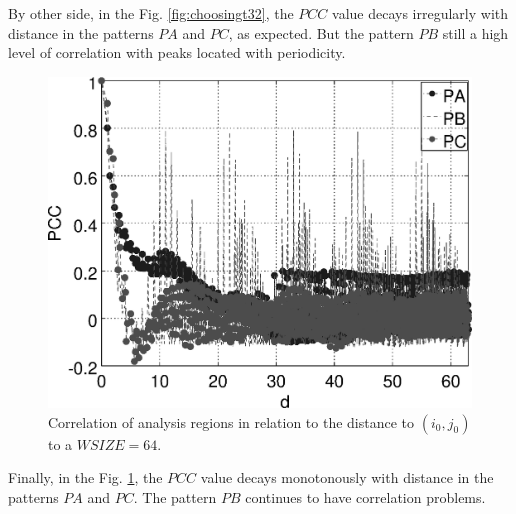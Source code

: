 By other side, in the Fig. \ref{fig:choosingt32}, the $PCC$ value decays irregularly with 
distance in the patterns $PA$ and $PC$, as expected. But the pattern $PB$ still 
a high level of correlation with  peaks located with periodicity.
\begin{figure}[H]
\centering
  \includegraphics[width=.55\columnwidth]{image_plot-64.eps}
  \caption{Correlation of analysis regions in relation to the distance to $(i_0,j_0)$ to a $WSIZE=64$.}
  \label{fig:choosingt64}
\end{figure}
Finally, in the Fig. \ref{fig:choosingt64}, the $PCC$ value decays monotonously with 
distance in the patterns $PA$ and $PC$. The pattern $PB$ continues to have 
correlation problems.
